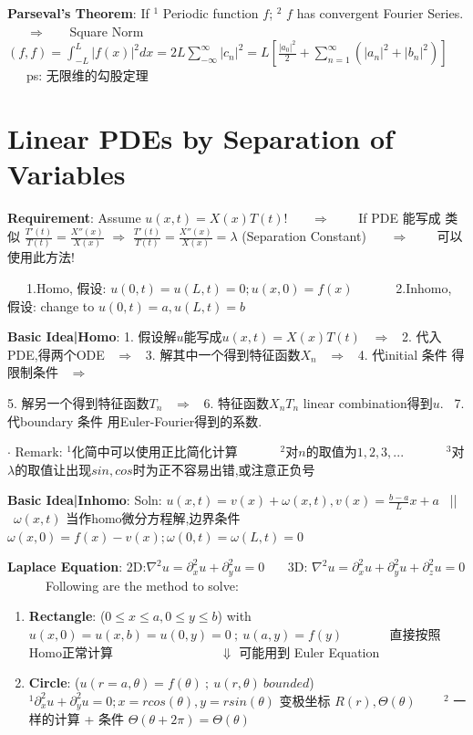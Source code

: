 \documentclass[8pt]{extarticle}
\begin{document}
\textbf{Parseval's Theorem}: If $^1$ Periodic function $f$; $^2$ $f$ has convergent Fourier Series.  \ \ \ $\Rightarrow$ \ \ \ Square Norm $(f,f)=\int_{-L}^{L}|f(x)|^2dx=2L\sum_{-\infty}^{\infty}|c_n|^2=L\left[\frac{|a_0|^2}{2}+\sum_{n=1}^{\infty}(|a_n|^2+|b_n|^2)\right]$ \ \ \  ps: 无限维的勾股定理


\section{Linear PDEs by Separation of Variables}

\begin{minipage}[t]{0.74\textwidth}
    \textbf{Requirement}: Assume $u(x,t)=X(x)T(t)$! \ \ \ $\Rightarrow$ \ \ \ { If PDE 能写成 类似 $\frac{T'(t)}{T(t)}=\frac{X''(x)}{X(x)}$ $\Rightarrow$ $\frac{T'(t)}{T(t)}=\frac{X''(x)}{X(x)}=\lambda$ (Separation Constant)} \ \ \ $\Rightarrow$ \ \ \ { 可以使用此方法!}

    \ \ \ 1.Homo, 假设: $u(0,t)=u(L,t)=0;u(x,0)=f(x)$ \ \ \ \ \ \ 2.Inhomo, 假设: change to $u(0,t)=a,u(L,t)=b$

    \textbf{Basic Idea|Homo}: { 1. 假设解$u$能写成$u(x,t)=X(x)T(t)$ \ $\Rightarrow$ \ 2. 代入PDE,得两个ODE \ $\Rightarrow$ \ 3. 解其中一个得到特征函数$X_n$ \ $\Rightarrow$ \ 4. 代initial 条件 得限制条件 \ $\Rightarrow$}

    \hspace{49pt} { 5. 解另一个得到特征函数$T_n$ \ $\Rightarrow$ \ 6. 特征函数$X_nT_n$ linear combination得到$u$. \ 7. 代boundary 条件 用Euler-Fourier得到的系数.}

    \hspace{49pt} $\cdot$ Remark: { $^1$化简中可以使用正比简化计算 \ \ \ \ \ \ $^2$对$n$的取值为$1,2,3,...$ \ \ \ \ \ \ $^3$对$\lambda$的取值让出现$sin,cos$时为正不容易出错,或注意正负号}

    \textbf{Basic Idea|Inhomo}: {\tiny Soln: $u(x,t)=v(x)+\omega(x,t),v(x)=\frac{b-a}{L}x+a$ \ || \ $\omega(x,t)$ 当作homo微分方程解,边界条件 $\omega(x,0)=f(x)-v(x);\omega(0,t)=\omega(L,t)=0$}

    \textbf{Laplace Equation}: 2D:$\nabla^2u=\partial^2_xu+\partial^2_yu=0$ \ \ \ 3D: $\nabla^2u=\partial^2_xu+\partial^2_yu+\partial^2_zu=0$ \ \ \ \ \ \ Following are the method to solve:

    \begin{enumerate}[itemsep=-2pt, topsep=-2pt]
        \item \textbf{Rectangle}: {\scriptsize ($0\leq x\leq a,0\leq y\leq b$) with $u(x,0)=u(x,b)=u(0,y)=0 \ ; \ u(a,y)=f(y)$} \ \ \ \ \ \ { 直接按照Homo正常计算} \ \ \ \ \ \ \ \ \ \ \ \ \ \ \ \ $\Downarrow$ { 可能用到 Euler Equation} 
        \item \textbf{Circle}: {\scriptsize ($u(r=a,\theta)=f(\theta) \ ; \ u(r,\theta) \ bounded$)} \ \ \ { $^1\partial_{x}^2u+\partial^2_yu=0;x=rcos(\theta),y=rsin(\theta)$ 变极坐标 $R(r),\Theta(\theta)$} \ \ \ { $^2$ 一样的计算 + 条件 $\Theta(\theta+2\pi)=\Theta(\theta)$}
    \end{enumerate}
    
\end{minipage}
\end{document}
